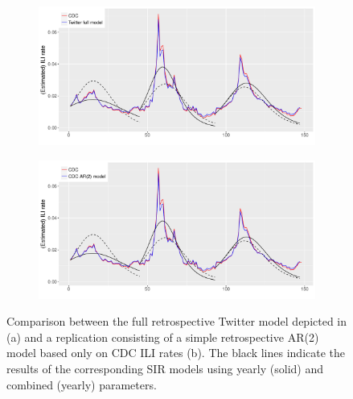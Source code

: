 \documentclass[11pt, a4paper,twoside]{report}\usepackage[]{graphicx}\usepackage[]{color}
\begin{document}
\begin{figure}[htbp!]
\centering
  \begin{subfigure}[t]{1\textwidth}
  \includegraphics[width=1\linewidth]{40_SIR_model_full_both_25_colorised.pdf}
  \caption{}
  \label{fig:TwitterModel_original}
  \end{subfigure}
  
  \begin{subfigure}[t]{1\textwidth}
  \includegraphics[width=1\linewidth]{41_SIR_model_full_AR2_25_colorised.pdf}
  \caption{}
  \end{subfigure}
  \caption{Comparison between the full retrospective Twitter model depicted in \cite{bodnar_data_2015} (a) and a replication consisting of a simple retrospective AR(2) model based only on CDC ILI rates (b). The black lines indicate the results of the corresponding SIR models using yearly (solid) and combined (yearly) parameters.}
  \label{fig:TwitterModel_comparison_ar}
\end{figure}
\end{document}
